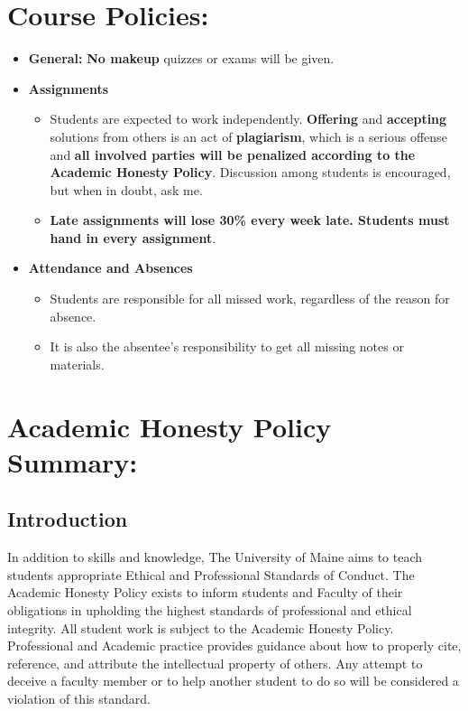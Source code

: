 \documentclass[11pt]{article}
\begin{document}
\section*{Course Policies:}
\label{sec:policies}

\begin{itemize}
\item \textbf {General:} \textbf {No makeup} quizzes or exams will be
  given.
\item \textbf {Assignments}
  \begin{itemize}
  \item Students are expected to work independently. \textbf{Offering}
    and \textbf{accepting} solutions from others is an act of
    \textbf{plagiarism}, which is a serious offense and \textbf{all
      involved parties will be penalized according to the Academic Honesty
      Policy}. Discussion among students is encouraged, but when in doubt,
    ask me.
  \item \textbf{Late assignments will lose 30\% every week late.
      Students must hand in every assignment}.
  \end{itemize}
\item \textbf{Attendance and Absences}
  \begin{itemize}
  \item Students are responsible for all missed work, regardless of
    the reason for absence.
  \item It is also the absentee's responsibility to get all missing
    notes or materials.
  \end{itemize}
\end{itemize}

\section*{Academic Honesty Policy Summary:}
\label{sec:honesty}

\subsection*{Introduction}
\label{sec:honesty-intro}

In addition to skills and knowledge, The University of Maine aims to
teach students appropriate Ethical and Professional Standards of
Conduct. The Academic Honesty Policy exists to inform students and
Faculty of their obligations in upholding the highest standards of
professional and ethical integrity. All student work is subject to the
Academic Honesty Policy. Professional and Academic practice provides
guidance about how to properly cite, reference, and attribute the
intellectual property of others. Any attempt to deceive a faculty
member or to help another student to do so will be considered a
violation of this standard.
\end{document}
